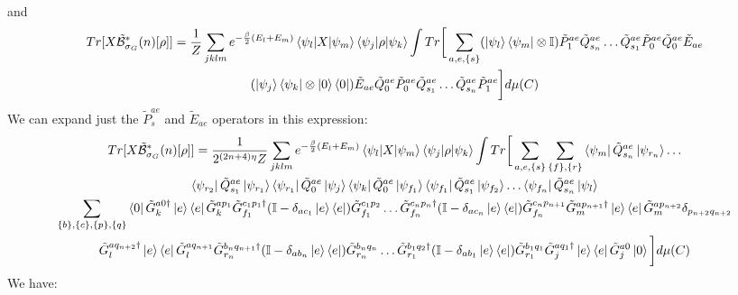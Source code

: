 \documentclass[aps,floatfix,10pt,amssymb,amsfont,amsmath,superscriptaddress,float,nofootinbib,longbibliography,nobalancelastpage,twocolumn]{revtex4-2}
\begin{document}
\begin{widetext}
\begin{multline}
\end{multline}
and
\begin{multline}
    Tr[X\tilde{\mathcal{B}}^*_{\sigma_G}(n)[\rho]] = \frac{1}{Z}\sum_{jklm}e^{-\frac{\beta}{2}(E_l+E_m)}\braket{\psi_l|X|\psi_m}\braket{\psi_j|\rho|\psi_k}\int Tr\bigg[ \sum_{a,e,\{s\}}(\ket{\psi_l}\bra{\psi_m}\otimes \mathbb{I})\tilde P^{ae}_1\tilde Q^{ae}_{s_n}\ldots \tilde Q^{ae}_{s_1}\tilde P^{ae}_0\tilde Q^{ae}_0\tilde E_{ae} \\(\ket{\psi_j}\bra{\psi_k}\otimes \ket{0}\bra{0})  \tilde E_{ae}\tilde Q^{ae}_0\tilde P^{ae}_0\tilde Q^{ae}_{s_1}\ldots \tilde Q^{ae}_{s_n}\tilde P^{ae}_1\bigg]d\mu(C)
\end{multline}
We can expand just the $\tilde P_s^{ae}$ and $\tilde E_{ae}$ operators in this expression:
\begin{multline}
    Tr[X\tilde{\mathcal{B}}^*_{\sigma_G}(n)[\rho]] = \frac{1}{2^{(2n+4)\eta}Z}\sum_{jklm}e^{-\frac{\beta}{2}(E_l+E_m)}\braket{\psi_l|X|\psi_m}\braket{\psi_j|\rho|\psi_k}\int Tr\bigg[ \sum_{a,e,\{s\}}\sum_{\{f\}, \{r\}}\bra{\psi_m}\tilde Q^{ae}_{s_n}\ket{\psi_{r_{n}}}\ldots \\\bra{\psi_{r_2}}\tilde Q^{ae}_{s_1}\ket{\psi_{r_1}}\bra{\psi_{r_1}}\tilde Q^{ae}_0\ket{\psi_j}
\bra{\psi_k}\tilde Q^{ae}_0\ket{\psi_{f_1}}\bra{\psi_{f_1}}\tilde Q^{ae}_{s_1}\ket{\psi_{f_2}}\ldots \bra{\psi_{f_{n}}}\tilde Q^{ae}_{s_n}\ket{\psi_l}\\
\sum_{\{b\}, \{c\}, \{p\}, \{q\}}
\bra{0}\tilde G^{a0\dagger}_k\ket{e}\bra{e}\tilde G^{ap_1}_k\tilde G^{c_1p_1\dagger}_{f_1}(\mathbb{I} - \delta_{ac_1}\ket{e}\bra{e})\tilde G^{c_1p_2}_{f_1}\ldots \tilde G^{c_np_n\dagger}_{f_n}(\mathbb{I} - \delta_{ac_n}\ket{e}\bra{e})\tilde G^{c_np_{n+1}}_{f_n}\tilde G^{ap_{n+1}\dagger}_{m}\ket{e}\bra{e}\tilde G^{ap_{n+2}}_m \delta_{p_{n+2}q_{n+2}}\\\tilde G^{aq_{n+2}\dagger}_l \ket{e}\bra{e}\tilde G^{aq_{n+1}}_l \tilde G^{b_{n}q_{n+1}\dagger}_{r_n}(\mathbb{I} - \delta_{ab_n}\ket{e}\bra{e})\tilde G^{b_nq_n}_{r_n}\ldots \tilde G^{b_1q_2\dagger}_{r_1}(\mathbb{I} - \delta_{ab_1}\ket{e}\bra{e})\tilde G^{b_1q_1}_{r_1}\tilde G^{aq_1\dagger}_j\ket{e}\bra{e}\tilde G^{a0}_j\ket{0}\bigg]d\mu(C)
\end{multline}
We have:

\end{widetext}
\end{document}

